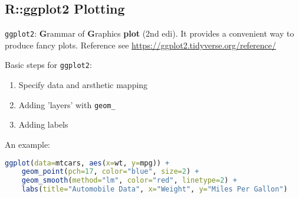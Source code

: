 \subsection{R::ggplot2 Plotting}
    \lstinline|ggplot2|: \textbf{G}rammar of \textbf{G}raphics \textbf{plot} (2nd edi). It provides a convenient way to produce fancy plots. Reference see \url{https://ggplot2.tidyverse.org/reference/}
    
    Basic steps for \lstinline|ggplot2|:
    \begin{enumerate}[topsep=2pt,itemsep=2pt]
        \item Specify data and arsthetic mapping
        \item Adding 'layers' with \lstinline|geom_|
        \item Adding labels
    \end{enumerate}

    An example:
\begin{lstlisting}[language=R]
ggplot(data=mtcars, aes(x=wt, y=mpg)) +
    geom_point(pch=17, color="blue", size=2) +
    geom_smooth(method="lm", color="red", linetype=2) +
    labs(title="Automobile Data", x="Weight", y="Miles Per Gallon")
\end{lstlisting}


